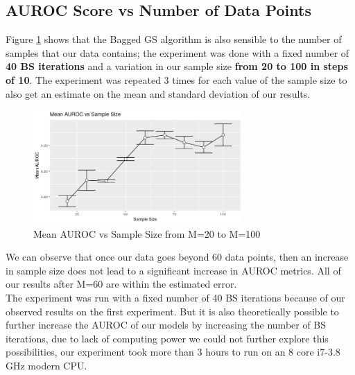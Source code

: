 \documentclass{article}
\begin{document}
	\subsection{AUROC Score vs Number of Data Points}
	Figure \ref{fig:auroc_sample_size} shows that the Bagged GS algorithm is also sensible to the number of
	samples that our data contains; the experiment was done with a fixed number
	of \textbf{40 BS iterations} and a variation in our sample size \textbf{from 20 to 100 in
	steps of 10}. The experiment was repeated 3 times for each value of the sample
	size to also get an estimate on the mean and standard deviation of our
	results.
	\begin{figure}[ht]
		\includegraphics[width=8cm]{auroc_sample_size}
		\centering
		\caption{Mean AUROC vs Sample Size from M=20 to M=100}
		\label{fig:auroc_sample_size}
	\end{figure}
	We can observe that once our data goes beyond 60 data points, then an
	increase in sample size does not lead to a significant increase in AUROC
	metrics. All of our results after M=60 are within the estimated error. \\
	The experiment was run with a fixed number of 40 BS iterations because of our
	observed results on the first experiment. But it is also theoretically
	possible to further increase the AUROC of our models by increasing the number
	of BS iterations, due to lack of computing power we could not further explore
	this possibilities, our experiment took more
	than 3 hours to run on an 8 core i7-3.8 GHz modern CPU.
\end{document}
